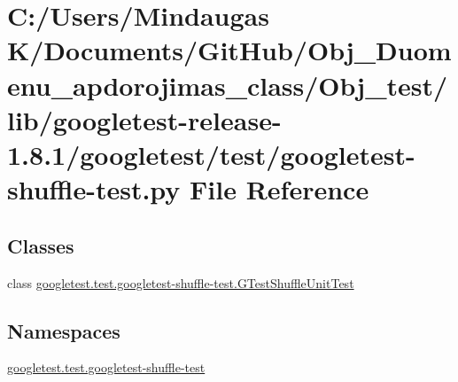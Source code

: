 \hypertarget{_obj__test_2lib_2googletest-release-1_88_81_2googletest_2test_2googletest-shuffle-test_8py}{}\section{C\+:/\+Users/\+Mindaugas K/\+Documents/\+Git\+Hub/\+Obj\+\_\+\+Duomenu\+\_\+apdorojimas\+\_\+class/\+Obj\+\_\+test/lib/googletest-\/release-\/1.8.1/googletest/test/googletest-\/shuffle-\/test.py File Reference}
\label{_obj__test_2lib_2googletest-release-1_88_81_2googletest_2test_2googletest-shuffle-test_8py}
\subsection*{Classes}
\begin{DoxyCompactItemize}
\item 
class \mbox{\hyperlink{classgoogletest_1_1test_1_1googletest-shuffle-test_1_1_g_test_shuffle_unit_test}{googletest.\+test.\+googletest-\/shuffle-\/test.\+G\+Test\+Shuffle\+Unit\+Test}}
\end{DoxyCompactItemize}
\subsection*{Namespaces}
\begin{DoxyCompactItemize}
\item 
 \mbox{\hyperlink{namespacegoogletest_1_1test_1_1googletest-shuffle-test}{googletest.\+test.\+googletest-\/shuffle-\/test}}
\end{DoxyCompactItemize}
